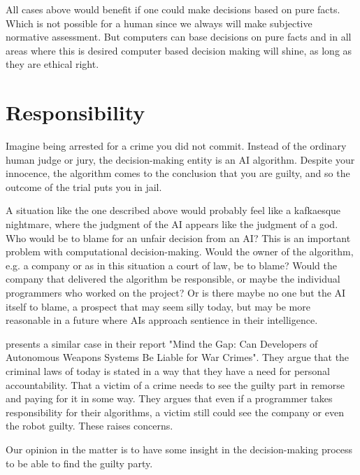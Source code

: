 \documentclass[11pt]{article}
\begin{document}
All cases above would benefit if one could make decisions based on pure facts. Which is not possible for a human
since we always will make subjective normative assessment. But computers can base decisions on pure facts and in all areas where this is desired computer based decision making will shine, as long as they are ethical right.

\section{Responsibility}
Imagine being arrested for a crime you did not commit.
Instead of the ordinary human judge or jury, the decision-making entity is an AI
algorithm. Despite your innocence, the algorithm comes to the conclusion that
you are guilty, and so the outcome of the trial puts you in jail.

A situation like the one described above would probably feel like a kafkaesque nightmare,
where the judgment of the AI appears like the judgment of a god. Who would be to
blame for an unfair decision from an AI? This is an important problem with
computational decision-making. Would the owner of the algorithm, e.g. a company
or as in this situation a court of law, be to blame? Would the company that
delivered the algorithm be responsible, or maybe the individual programmers who
worked on the project? Or is there maybe no one but the AI itself to blame, a
prospect that may seem silly today, but may be more reasonable in a future where
AIs approach sentience in their intelligence.

\citeauthor{mcfarland2014mind} presents a similar case in their report "Mind the Gap: Can Developers of Autonomous Weapons Systems Be Liable for War Crimes". They argue that the criminal laws of today is stated in a way that they have a need for personal accountability. That a victim of a crime needs to see the guilty part in remorse and paying for it in some way. They argues that even if a programmer takes responsibility for their algorithms, a victim still could see the company or even the robot guilty. These raises concerns.

Our opinion in the matter is to have some insight in the decision-making process to be able to find the guilty party. 

\end{document}

